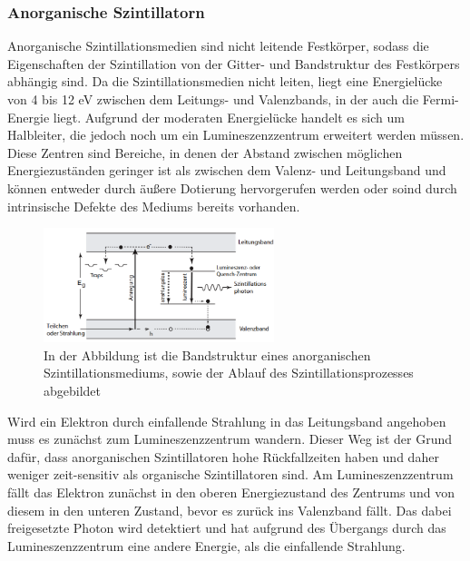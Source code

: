             \subsubsection*{Anorganische Szintillatorn}
                Anorganische Szintillationsmedien sind nicht leitende Festkörper, sodass die Eigenschaften der Szintillation von der Gitter- und Bandstruktur des Festkörpers abhängig sind. Da die 
                Szintillationsmedien nicht leiten, liegt eine Energielücke von 4 bis 12 eV zwischen dem Leitungs- und Valenzbands, in der auch die Fermi-Energie liegt. Aufgrund der moderaten Energielücke 
                handelt es sich um Halbleiter, die jedoch noch um ein Lumineszenzzentrum erweitert werden müssen. Diese Zentren sind Bereiche, in denen der Abstand zwischen möglichen Energiezuständen geringer 
                ist als zwischen dem Valenz- und Leitungsband und können entweder durch äußere Dotierung hervorgerufen werden oder soind durch intrinsische Defekte des Mediums bereits vorhanden.
                
                \FloatBarrier

                \begin{figure}[h]
                  \centering
                  \includegraphics[width = 0.6\textwidth]{pictures/Bandstruktur.png}
                  \caption{In der Abbildung ist die Bandstruktur eines anorganischen Szintillationsmediums, sowie der Ablauf des Szintillationsprozesses abgebildet}
                  \label{fig:Bandstruktur}
                \end{figure}
        
                \FloatBarrier
        
                \noindent

                Wird ein Elektron durch einfallende Strahlung in das Leitungsband angehoben muss es zunächst zum Lumineszenzzentrum wandern. Dieser Weg ist der Grund dafür, dass anorganischen Szintillatoren
                hohe Rückfallzeiten haben und daher weniger zeit-sensitiv als organische Szintillatoren sind. Am Lumineszenzzentrum fällt das Elektron zunächst in den oberen Energiezustand des Zentrums und
                von diesem in den unteren Zustand, bevor es zurück ins Valenzband fällt. Das dabei freigesetzte Photon wird detektiert und hat aufgrund des Übergangs durch das Lumineszenzzentrum eine andere 
                Energie, als die einfallende Strahlung.


